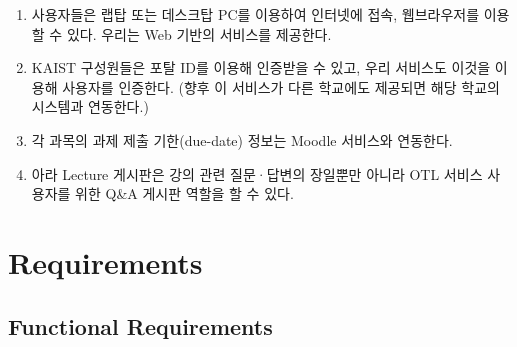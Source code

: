 \documentclass[a4paper,titlepage]{article}
\begin{document}
\begin{enumerate}
	\item 사용자들은 랩탑 또는 데스크탑 PC를 이용하여 인터넷에 접속, 웹브라우저를 이용할 수 있다.
	우리는 Web 기반의 서비스를 제공한다.

	\item KAIST 구성원들은 포탈 ID를 이용해 인증받을 수 있고, 우리 서비스도 이것을 이용해 사용자를 인증한다.
	(향후 이 서비스가 다른 학교에도 제공되면 해당 학교의 시스템과 연동한다.)

	\item 각 과목의 과제 제출 기한(due-date) 정보는 Moodle 서비스와 연동한다.

	\item 아라 Lecture 게시판은 강의 관련 질문·답변의 장일뿐만 아니라 OTL 서비스 사용자를 위한 Q\&A 게시판 역할을 할 수 있다.

\end{enumerate}

\pagebreak
\section{Requirements}
\subsection{Functional Requirements}
\end{document}
